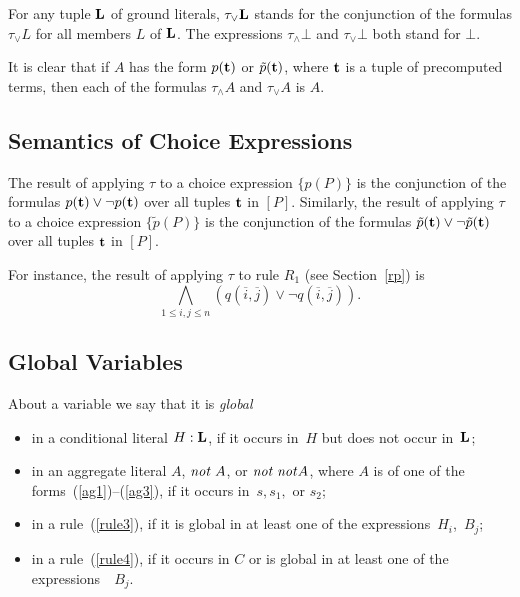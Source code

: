 \documentclass{tlp}
\def\ar{\leftarrow}
\def\beq{\begin{equation}}
\def\eeq#1{\label{#1}\end{equation}}
\def\i#1{\hbox{\it #1\/}}
\def\no{{\it not}}
\begin{document}
For any tuple ${\bf L}$ of ground literals,
$\tau_{\lor}{\bf L}$ stands for the conjunction of the formulas
$\tau_{\lor}L$ for all
members $L$ of ${\bf L}$. The expressions $\tau_{\land}\bot$ and
$\tau_{\lor}\bot$ both stand for $\bot$.

It is clear that if $A$ has the form $p({\bf t})$ or $\tilde{p}({\bf t})$,
where ${\bf t}$ is a tuple of precomputed terms, then each of the
formulas $\tau_{\land} A$ and $\tau_{\lor} A$ is $A$.

\subsection{Semantics of Choice Expressions}

The result of applying $\tau$ to a choice expression $\{p(P)\}$ is the
conjunction of the formulas
$p({\bf t}) \lor \neg p({\bf t})$ over all tuples ${\bf t}$ in $[P]$.
Similarly, the result of applying $\tau$ to a choice expression $\{\tilde{p}(P)\}$
is the conjunction of the formulas $\tilde{p}({\bf t}) \lor \neg \tilde{p}({\bf t})$
over all tuples ${\bf t}$ in $[P]$.

For instance, the result of applying $\tau$ to rule $R_1$ (see
Section~\ref{rp}) is
\beq
\bigwedge_{1 \leq i,j \leq n} \left ( q(\overline i, \overline j) \lor \neg q(\overline i, \overline j)
\right ).
\eeq{tauR_1}

\subsection{Global Variables}\label{sem:global}

About a variable we say that it is {\sl global}
\begin{itemize}
\item
in a conditional literal $H : {\bf L}$, if it occurs in~$H$ but does not
occur in~${\bf L}$;
\item
in an aggregate literal $A$, $\no \; A$, or $\no \; \no A$, where $A$ is of one of
the forms~(\ref{ag1})--(\ref{ag3}), if it occurs in~$s, s_1,$ or $s_2$;
\item
in a rule~(\ref{rule3}), if it is global in at least one of the
expressions~$H_i$,~$B_j$;
\item
in a rule~(\ref{rule4}), if it occurs in $C$ or is global in at least one of
the expressions~~$B_j$.
\end{itemize}
\end{document}
